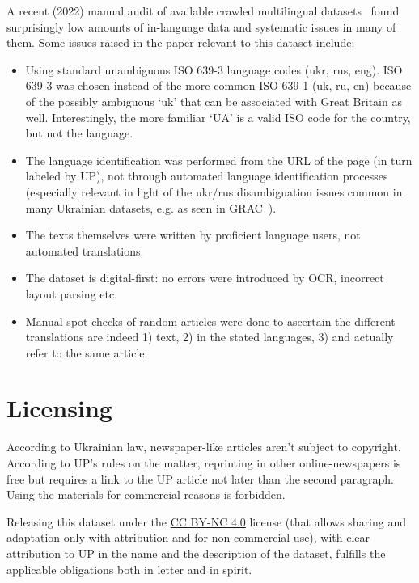 A recent (2022) manual audit of available crawled multilingual datasets~\cite{10.1162/tacl_a_00447} found surprisingly low amounts of in-language data and systematic issues in many of them. Some issues raised in the paper relevant to this dataset include:
\begin{itemize}
\tightlist
    \item Using standard unambiguous ISO 639-3 language codes (ukr, rus, eng). ISO 639-3 was chosen instead of the more common ISO 639-1 (uk, ru, en) because of the possibly ambiguous `uk' that can be associated with Great Britain as well. Interestingly, the more familiar `UA' is a valid ISO code for the country, but not the language.
    \item The language identification was performed from the URL of the page (in turn labeled by UP), not through automated language identification processes (especially relevant in light of the ukr/rus disambiguation issues common in many Ukrainian datasets, e.g. as seen in GRAC~\cite{9648705}).
    \item The texts themselves were written by proficient language users, not automated translations.
    \item The dataset is digital-first: no errors were introduced by OCR, incorrect layout parsing etc.
    \item Manual spot-checks of random articles were done to ascertain the different translations are indeed 1) text, 2) in the stated languages, 3) and actually refer to the same article.
\end{itemize}

\section{Licensing}
According to Ukrainian law, newspaper-like articles aren't subject to copyright. According to UP's rules on the matter, reprinting in other online-newspapers is free but requires a link to the UP article not later than the second paragraph. Using the materials for commercial reasons is forbidden.

Releasing this dataset under the \href{https://creativecommons.org/licenses/by-nc/4.0/}{CC BY-NC 4.0} license (that allows sharing and adaptation only with attribution and for non-commercial use), with clear attribution to UP in the name and the description of the dataset, fulfills the applicable obligations both in letter and in spirit.



